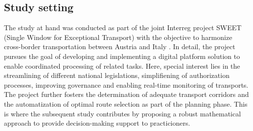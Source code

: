 %
\subsection{Study setting}
The study at hand was conducted as part of the joint Interreg project SWEET (Single Window for Exceptional Transport) with the objective to harmonize cross-border \ohc transportation between Austria and Italy \cite{Sweet}. In detail, the project pursues the goal of developing and implementing a digital platform solution to enable coordinated processing of \ohc related tasks. Here, special interest lies in the streamlining of different national legislations, simplifiening of authorization processes, improving governance and enabling real-time monitoring of transports. The project further fosters the determination of adequate transport corridors and the automatization of optimal route selection as part of the \ohc planning phase. This is where the subsequent study contributes by proposing a robust mathematical approach to provide decision-making support to practicioners.   

